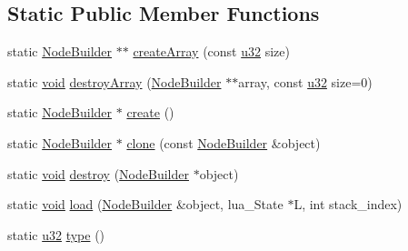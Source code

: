 \subsection*{Static Public Member Functions}
\begin{DoxyCompactItemize}
\item 
static \mbox{\hyperlink{classnjli_1_1_node_builder}{Node\+Builder}} $\ast$$\ast$ \mbox{\hyperlink{classnjli_1_1_node_builder_a11ab516128b4bd4ac95a2cae46d3b871}{create\+Array}} (const \mbox{\hyperlink{_util_8h_a10e94b422ef0c20dcdec20d31a1f5049}{u32}} size)
\item 
static \mbox{\hyperlink{_thread_8h_af1e856da2e658414cb2456cb6f7ebc66}{void}} \mbox{\hyperlink{classnjli_1_1_node_builder_a1e3ef77bb9b523dc0fdba32be7cdfd5c}{destroy\+Array}} (\mbox{\hyperlink{classnjli_1_1_node_builder}{Node\+Builder}} $\ast$$\ast$array, const \mbox{\hyperlink{_util_8h_a10e94b422ef0c20dcdec20d31a1f5049}{u32}} size=0)
\item 
static \mbox{\hyperlink{classnjli_1_1_node_builder}{Node\+Builder}} $\ast$ \mbox{\hyperlink{classnjli_1_1_node_builder_ac22ec084ecc2a6e4fed2ded2677c6092}{create}} ()
\item 
static \mbox{\hyperlink{classnjli_1_1_node_builder}{Node\+Builder}} $\ast$ \mbox{\hyperlink{classnjli_1_1_node_builder_aeb94f3016709aa566a40ee440d33faff}{clone}} (const \mbox{\hyperlink{classnjli_1_1_node_builder}{Node\+Builder}} \&object)
\item 
static \mbox{\hyperlink{_thread_8h_af1e856da2e658414cb2456cb6f7ebc66}{void}} \mbox{\hyperlink{classnjli_1_1_node_builder_ae48cb203c697e148be8ae96f6d4fa58e}{destroy}} (\mbox{\hyperlink{classnjli_1_1_node_builder}{Node\+Builder}} $\ast$object)
\item 
static \mbox{\hyperlink{_thread_8h_af1e856da2e658414cb2456cb6f7ebc66}{void}} \mbox{\hyperlink{classnjli_1_1_node_builder_a2237a6ded1cb3e16280bb614038da1f4}{load}} (\mbox{\hyperlink{classnjli_1_1_node_builder}{Node\+Builder}} \&object, lua\+\_\+\+State $\ast$L, int stack\+\_\+index)
\item 
static \mbox{\hyperlink{_util_8h_a10e94b422ef0c20dcdec20d31a1f5049}{u32}} \mbox{\hyperlink{classnjli_1_1_node_builder_ae9741693ab2cb281c617ae99401e4eb7}{type}} ()
\end{DoxyCompactItemize}
